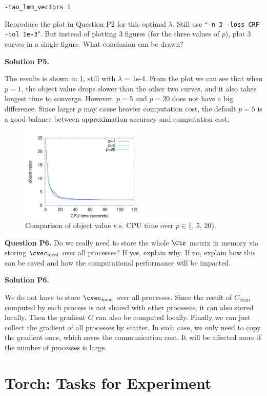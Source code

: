 \documentclass[11pt]{report}
\begin{document}
{\verb!-tao_lmm_vectors 1!

Reproduce the plot in Question P2 for this optimal $\lambda$.
Still use ``\verb!-n 3 -loss CRF -tol 1e-3!".
But instead of plotting 3 figures (for the three values of $p$),
plot 3 curves in a single figure.
What conclusion can be drawn?

{\bf Solution P5.}

The results is shown in \ref{fig:LBFGS}, still with $\lambda$ = {\sf 1e-4}. From the plot we can see that when $p=1$, the object value drops slower than the other two curves, and it also takes longest time to converge. However, $p=5$ and $p=20$ does not have a big difference. Since larger $p$ may cause heavier computation cost, the default $p=5$ is a good balance between approximation accuracy and computation cost.

\begin{figure}[htbp!] 
\centering
\includegraphics[width=5.8cm]{p5_LBFGS}
\caption{Comparison of object value v.s. CPU time over $p \in \{${, 5, 20}\}.}
\label{fig:LBFGS}
\end{figure}

{\bf Question P6.}
Do we really need to store the whole $\Ctr$ matrix in memory via storing $\cvec_{\text{local}}$ over all processes?
If yes, explain why.
If no, explain how this can be saved and how the computational performance will be impacted.

{\bf Solution P6.}

We do not have to store $\cvec_{\text{local}}$ over all processes. Since the result of $C_{\text{train}}$ computed by each process is not shared with other processes, it can also stored locally. Then the gradient $G$ can also be computed locally. Finally we can just collect the gradient of all processes by scatter. In such case, we only need to copy the gradient once, which saves the communication cost. It will be affected more if the number of processes is large.

\section{Torch: Tasks for Experiment}

}
\end{document}
